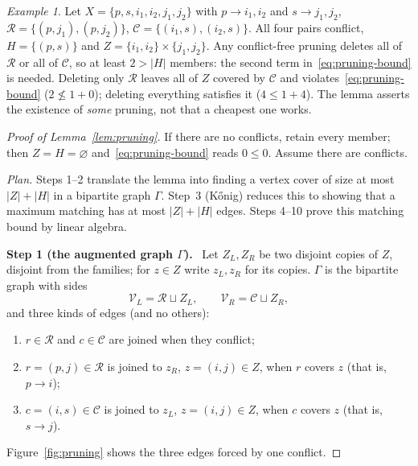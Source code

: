 \documentclass[11pt]{article}
\theoremstyle{remark}
\newtheorem{example}[theorem]{Example}
\newcommand{\abs}[1]{\lvert #1\rvert}
\newcommand{\step}[1]{\par\medskip\noindent\textbf{Step #1.}\ }
\begin{document}
\begin{example}\label{ex:pruning}
Let $X=\{p,s,i_1,i_2,j_1,j_2\}$ with $p\to i_1,i_2$ and $s\to j_1,j_2$,
$\mathcal R=\{(p,j_1),(p,j_2)\}$, $\mathcal C=\{(i_1,s),(i_2,s)\}$. All four
pairs conflict, $H=\{(p,s)\}$ and $Z=\{i_1,i_2\}\times\{j_1,j_2\}$. Any
conflict-free pruning deletes all of $\mathcal R$ or all of $\mathcal C$, so
at least $2>\abs H$ members: the second term in~\eqref{eq:pruning-bound} is
needed. Deleting only $\mathcal R$ leaves all of $Z$ covered by $\mathcal C$
and violates~\eqref{eq:pruning-bound} ($2\not\le1+0$); deleting everything
satisfies it ($4\le1+4$). The lemma asserts the existence of \emph{some}
pruning, not that a cheapest one works.
\end{example}

\begin{proof}[Proof of Lemma~\ref{lem:pruning}]
If there are no conflicts, retain every member; then $Z=H=\varnothing$
and~\eqref{eq:pruning-bound} reads $0\le0$. Assume there are conflicts.

\emph{Plan.} Steps 1--2 translate the lemma into finding a vertex cover of
size at most $\abs Z+\abs H$ in a bipartite graph $\Gamma$. Step~3
(K\H{o}nig) reduces this to showing that a maximum matching has at most
$\abs Z+\abs H$ edges. Steps 4--10 prove this matching bound by linear
algebra.

\step{1 (the augmented graph $\Gamma$)}
Let $Z_L,Z_R$ be two disjoint copies of $Z$, disjoint from the families; for
$z\in Z$ write $z_L,z_R$ for its copies. $\Gamma$ is the bipartite graph with
sides
\[
 \mathcal V_L=\mathcal R\sqcup Z_L,
 \qquad
 \mathcal V_R=\mathcal C\sqcup Z_R,
\]
and three kinds of edges (and no others):
\begin{enumerate}[label=\textup{(E\arabic*)},leftmargin=3em,itemsep=1pt]
\item $r\in\mathcal R$ and $c\in\mathcal C$ are joined when they conflict;
\item $r=(p,j)\in\mathcal R$ is joined to $z_R$, $z=(i,j)\in Z$, when $r$
covers $z$ (that is, $p\to i$);
\item $c=(i,s)\in\mathcal C$ is joined to $z_L$, $z=(i,j)\in Z$, when $c$
covers $z$ (that is, $s\to j$).
\end{enumerate}
Figure~\ref{fig:pruning} shows the three edges forced by one conflict.


\end{proof}
\end{document}
